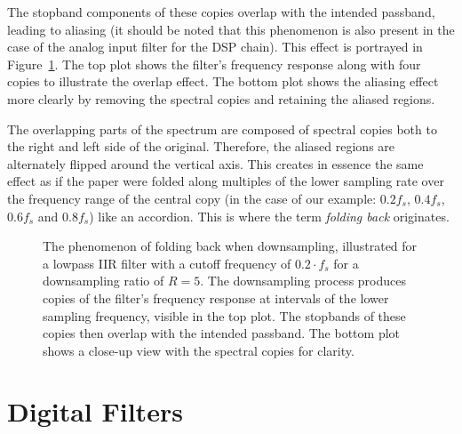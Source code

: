 The stopband  components of these  copies overlap with the  intended passband,
leading to aliasing  (it should be noted that this  phenomenon is also present
in the  case of  the analog input  filter for the  DSP chain). This  effect is
portrayed  in  Figure~\ref{fig:aliasing:iirCopies}. The  top  plot  shows  the
filter's frequency response  along with four copies to  illustrate the overlap
effect. The bottom plot shows the aliasing effect more clearly by removing the
spectral copies and retaining the aliased regions.

The overlapping parts of the spectrum  are composed of spectral copies both to
the right  and left side of  the original. Therefore, the aliased  regions are
alternately flipped around the vertical axis. This creates in essence the same
effect  as if  the paper  were folded  along multiples  of the  lower sampling
rate  over the  frequency  range of  the  central  copy (in  the  case of  our
example: $0.2f_s$, $0.4f_s$, $0.6f_s$ and $0.8f_s$) like an accordion. This is
where the term \emph{folding back} originates.

\begin{figure}
    \centering
    
    \caption[Folding Back of Stopband Components Into Passband]{%
        The phenomenon  of folding back  when downsampling, illustrated  for a
        lowpass IIR  filter with a  cutoff frequency  of $0.2\cdot f_s$  for a
        downsampling ratio of $R=5$.  The downsampling process produces copies
        of the filter's frequency response  at intervals of the lower sampling
        frequency, visible  in the  top plot.  The  stopbands of  these copies
        then  overlap with  the intended  passband.  The  bottom plot  shows a
        close-up view with the spectral copies for clarity.%
    }
    \label{fig:aliasing:iirCopies}
\end{figure}

%
%
\section{Digital Filters}%
\label{sec:digital_filters}

